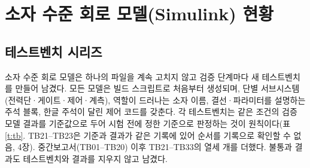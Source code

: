 \chapter{소자 수준 회로 모델(Simulink) 현황}

\section{테스트벤치 시리즈}

소자 수준 회로 모델은 하나의 파일을 계속 고치지 않고 검증 단계마다 새 테스트벤치를 만들어 남겼다. 모든 모델은 빌드 스크립트로 처음부터 생성되며, 단별 서브시스템(전력단·게이트·제어·계측), 역할이 드러나는 소자 이름, 결선·파라미터를 설명하는 주석 블록, 한글 주석이 달린 제어 코드를 갖춘다. 각 테스트벤치는 같은 조건의 검증 모델 결과를 기준값으로 두어 시험 전에 정한 기준으로 판정하는 것이 원칙이다(표 \ref{t:tb}. TB21–TB23은 기준과 결과가 같은 기록에 있어 순서를 기록으로 확인할 수 없음, 4장). 중간보고서(TB01–TB20) 이후 TB21–TB33의 열세 개를 더했다. 불통과 결과도 테스트벤치와 결과를 지우지 않고 남겼다.

